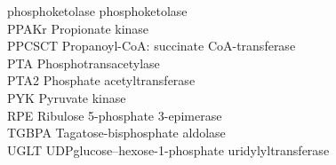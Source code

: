 phosphoketolase \hspace{.5em} phosphoketolase \\
PPAKr \hspace{.5em} Propionate kinase \\
PPCSCT \hspace{.5em} Propanoyl-CoA: succinate CoA-transferase \\
PTA \hspace{.5em} Phosphotransacetylase \\
PTA2 \hspace{.5em} Phosphate acetyltransferase \\
PYK \hspace{.5em} Pyruvate kinase \\
RPE \hspace{.5em} Ribulose 5-phosphate 3-epimerase \\
TGBPA \hspace{.5em} Tagatose-bisphosphate aldolase \\
UGLT \hspace{.5em} UDPglucose--hexose-1-phosphate uridylyltransferase \\


